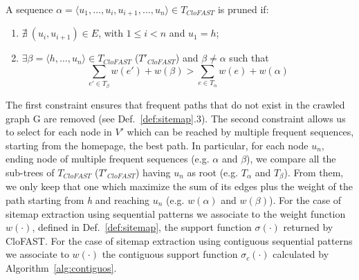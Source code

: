 A sequence  $\alpha = \langle u_1, \dots, u_i, u_{i+1}, \dots, u_n \rangle \in T_{CloFAST}$ is pruned if:
\begin{enumerate}
\item $\nexists~(u_i, u_{i+1}) \in E$, with $1 \leq i < n$ and $u_1 = h$;
\item $\exists \beta = \langle h, \dots, u_n \rangle \in T_{CloFAST}$ ($T'_{CloFAST}$) and $\beta \neq \alpha$ such that 
\begin{equation}
\label{eq:pruning}
\sum_{e' \in T_{\beta}}w(e') + w(\beta) > \sum_{e \in T_{\alpha}}w(e) + w(\alpha)
\end{equation}
\end{enumerate}
The first constraint ensures that frequent paths that do not exist in the crawled graph G are removed (see Def.~\ref{def:sitemap}.3).  The second constraint allows us to select for each node in $V'$ which can be reached by multiple frequent sequences, starting from the homepage, the best path. 
 In particular, for each node $u_n$, ending node of multiple frequent sequences (e.g. $\alpha$ and $\beta$), we compare all the sub-trees of $T_{CloFAST}$ ($T'_{CloFAST}$) having $u_n$ as root (e.g. $T_\alpha$ and $T_\beta$). From them, we only keep that one which maximize the sum of its edges plus the weight of the path starting from \emph{h} and reaching $u_n$ (e.g. $w(\alpha)$ and $w(\beta)$). For the case of sitemap extraction using sequential patterns we associate to the weight function $w(\cdot)$, defined in Def.~\ref{def:sitemap}, the support function $\sigma(\cdot)$ returned by CloFAST. For the case of sitemap extraction using contiguous sequential patterns we associate to $w(\cdot)$ the contiguous support function $\sigma_c(\cdot)$ calculated by Algorithm~\ref{alg:contiguos}. 

